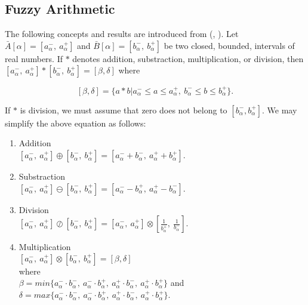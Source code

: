 \documentclass{iaesarticle3}
\begin{document}
\subsection{Fuzzy Arithmetic}

The following concepts and results are introduced from (\cite{kau}, \cite{jam}). Let $ \bar{A}[\alpha] = [a_\alpha^-,\ a_\alpha^+]$ and $\bar{B}[\alpha] = [b_\alpha^-,\ b_\alpha^+]$ be two closed, bounded, intervals of real numbers. If $*$ denotes addition, substraction, multiplication, or division, then $[a_\alpha^-,\ a_\alpha^+] * [b_\alpha^-,\ b_\alpha^+] = [\beta, \delta]$ where

   $$  [\beta, \delta] = \{a * b | a_\alpha^- \leq a \leq a_\alpha^+,~ b_\alpha^- \leq b \leq b_\alpha^+\}.$$

If $*$ is division, we must assume that zero does not belong to $[b_\alpha^-, b_\alpha^+]$. We may simplify the above equation as follows:

\begin{enumerate}
    \item Addition\\
        $[a_\alpha^-,\ a_\alpha^+] \oplus [b_\alpha^-,\ b_\alpha^+] = [a_\alpha^- + b_\alpha^-,\ a_\alpha^+ + b_\alpha^+]$.
    \item Substraction\\
        $[a_\alpha^-,\ a_\alpha^+] \ominus [b_\alpha^-,\ b_\alpha^+] = [a_\alpha^- - b_\alpha^+,\ a_\alpha^+ - b_\alpha^-]$.
    \item Division \\
        $[a_\alpha^-,\ a_\alpha^+] \oslash [b_\alpha^-,\ b_\alpha^+] = [a_\alpha^-,\ a_\alpha^+] \otimes [\frac{1}{b_\alpha^+},\ \frac{1}{b_\alpha^-}]$.
    \item Multiplication\\
        $[a_\alpha^-,\ a_\alpha^+] \otimes [b_\alpha^-,\ b_\alpha^+] = [\beta, \delta]$ \\
        where\\ $\beta = min\{a_\alpha^-\cdot b_\alpha^-,\ a_\alpha^-\cdot b_\alpha^+,\ a_\alpha^+\cdot b_\alpha^-,\ a_\alpha^+\cdot b_\alpha^+ \}$ and\\
        $\delta = max\{a_\alpha^-\cdot b_\alpha^-,\ a_\alpha^-\cdot b_\alpha^+,\ a_\alpha^+\cdot b_\alpha^-,\ a_\alpha^+\cdot b_\alpha^+ \}$.
\end{enumerate}
\end{document}
